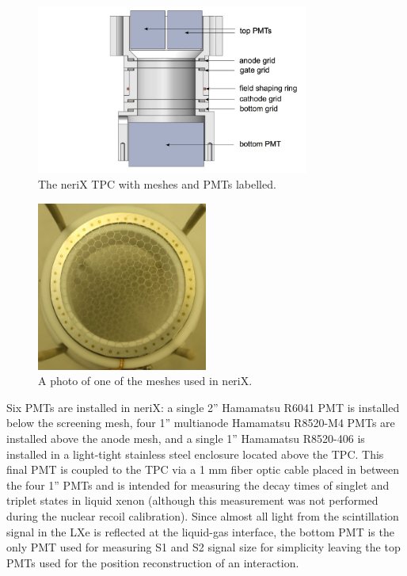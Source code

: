 \begin{figure}[t]
        \centering
	\includegraphics[width=0.8\textwidth]{nerix_tpc_labeled}
	\caption{The neriX TPC with meshes and PMTs labelled.}
	\label{fig:nerix_tpc_labeled}
\end{figure}
   
   
\begin{figure}[bt]
        \centering
	\includegraphics[width=0.5\textwidth]{nerix_tpc_mesh}
	\caption{A photo of one of the meshes used in neriX.}
	\label{fig:nerix_tpc_mesh}
\end{figure}



Six PMTs are installed in neriX: a single 2'' Hamamatsu R6041 PMT is installed below the screening mesh, four 1'' multianode Hamamatsu R8520-M4 PMTs are installed above the anode mesh, and a single 1'' Hamamatsu R8520-406 is installed in a light-tight stainless steel enclosure located above the TPC.  This final PMT is coupled to the TPC via a 1 mm fiber optic cable placed in between the four 1'' PMTs and is intended for measuring the decay times of singlet and triplet states in liquid xenon (although this measurement was not performed during the nuclear recoil calibration).  Since almost all light from the scintillation signal in the LXe is reflected at the liquid-gas interface, the bottom PMT is the only PMT used for measuring S1 and S2 signal size for simplicity leaving the top PMTs used for the position reconstruction of an interaction.

